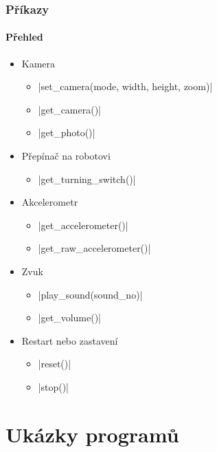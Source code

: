 \documentclass{beamer}
\begin{document}
\begin{frame}
    \frametitle{Příkazy}
    \framesubtitle{Přehled}
    \begin{itemize}
        \item Kamera
        \begin{itemize}
            \item {}|set_camera(mode, width, height, zoom)|
            \item {}|get_camera()|
            \item {}|get_photo()|
        \end{itemize}
        \item Přepínač na robotovi
        \begin{itemize}
            \item {}|get_turning_switch()|
        \end{itemize}
        \item Akcelerometr
        \begin{itemize}
            \item {}|get_accelerometer()|
            \item {}|get_raw_accelerometer()|
        \end{itemize}
        \item Zvuk
        \begin{itemize}
            \item {}|play_sound(sound_no)|
            \item {}|get_volume()|
        \end{itemize}
        \item Restart nebo zastavení
        \begin{itemize}
            \item {}|reset()|
            \item {}|stop()|
        \end{itemize}
    \end{itemize}
\end{frame}
\section{Ukázky programů}
\end{document}
